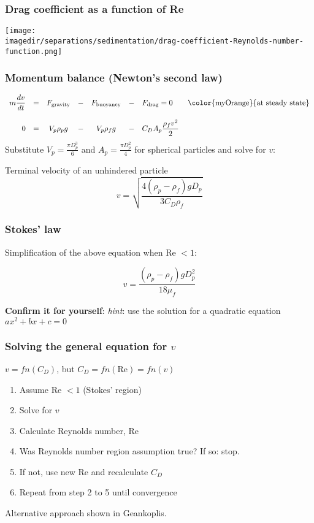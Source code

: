 \begin{frame}\frametitle{Drag coefficient as a function of Re}
	\begin{center}
		\texttt{[image: \\imagedir/separations/sedimentation/drag-coefficient-Reynolds-number-function.png]}
	\end{center}
\end{frame}

\begin{frame}\frametitle{Momentum balance (Newton's second law)}	
	\[
	\begin{array}{rcccccl}
		\displaystyle m\frac{dv}{dt} &=&  F_\text{gravity} &-& F_\text{buoyancy} &-& F_\text{drag} = 0 \qquad \text{\color{myOrange}{at steady state}} \\		
		\\
		0 &=&  V_p \rho_p g &-& V_p \rho_f g &-& C_D A_p \displaystyle \frac{\rho_f v^2}{2} 
	\end{array}
	\]
	Substitute $V_p = \displaystyle \frac{\pi D_p^3}{6}$ and $A_p = \displaystyle \frac{\pi D_p^2}{4}$ for spherical particles and solve for $v$:
	
	\begin{exampleblock}{Terminal velocity of an unhindered particle}
		\[
			v = \sqrt{\frac{4\left(\rho_p - \rho_f \right)g D_p}{3 C_D \rho_f}}
		\]
	\end{exampleblock}
\end{frame}

\begin{frame}\frametitle{Stokes' law}
	
	Simplification of the above equation when Re $< 1$:
	
	\[
		v = \frac{\left( \rho_p - \rho_f \right) g D_p^2}{18 \mu_f}
	\]	
	
	\vspace{12pt}
	\textbf{Confirm it for yourself}: \emph{hint}: use the solution for a quadratic equation $ax^2 + bx + c = 0$
\end{frame}

\begin{frame}\frametitle{Solving the general equation for $v$}
	
	$v = fn(C_D)$, but $C_D = fn(\text{Re}) = fn(v)$
	
	\begin{enumerate}
		\item	Assume Re $< 1$ (Stokes' region)
		\item	Solve for $v$
		\item	Calculate Reynolds number, Re
		\item	Was Reynolds number region assumption true? If so: stop. 
		\item	If not, use new Re and recalculate $C_D$
		\item	Repeat from step 2 to 5 until convergence		
	\end{enumerate}
	
	\vspace{12pt}
	Alternative approach shown in Geankoplis.	
\end{frame}

